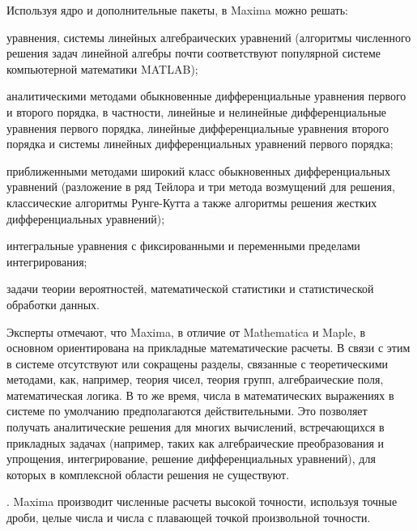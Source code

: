 Используя ядро и дополнительные пакеты, в Maxima можно решать:
\begin{textitemize}
	\item уравнения, системы линейных алгебраических уравнений (алгоритмы численного решения задач линейной алгебры почти соответствуют популярной системе компьютерной математики MATLAB);
	\item аналитическими методами обыкновенные дифференциальные уравнения первого и второго порядка, в частности, линейные и нелинейные дифференциальные уравнения первого порядка, линейные дифференциальные уравнения второго порядка и системы линейных дифференциальных уравнений первого порядка;
	\item приближенными методами широкий класс обыкновенных дифференциальных уравнений (разложение в ряд Тейлора и три метода возмущений для решения, классические алгоритмы Рунге-Кутта а также алгоритмы решения жестких дифференциальных уравнений);
	\item интегральные уравнения с фиксированными и переменными пределами интегрирования;
	\item задачи теории вероятностей, математической статистики и статистической обработки данных.
\end{textitemize}

Эксперты отмечают, что Maxima, в отличие от Mathematica и Maple, в основном ориентирована на прикладные математические расчеты. В связи с этим в системе отсутствуют или сокращены разделы, связанные с теоретическими методами, как, например, теория чисел, теория групп, алгебраические поля, математическая логика. В то же время, числа в математических выражениях в системе по умолчанию предполагаются действительными. Это позволяет получать аналитические решения для многих вычислений, встречающихся в прикладных задачах (например, таких как алгебраические преобразования и упрощения, интегрирование, решение дифференциальных уравнений), для которых в комплексной области решения не существуют.

. Maxima производит численные расчеты высокой точности, используя точные дроби, целые числа и числа с плавающей точкой произвольной точности.

